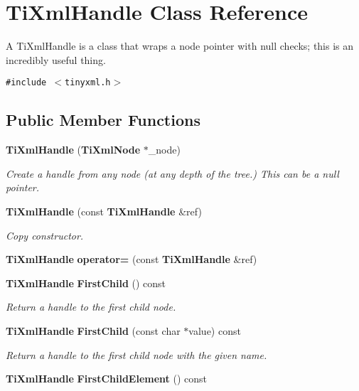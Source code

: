 \section{Ti\-Xml\-Handle Class Reference}
\label{classTiXmlHandle}
A Ti\-Xml\-Handle is a class that wraps a node pointer with null checks; this is an incredibly useful thing.  


{\tt \#include $<$tinyxml.h$>$}

\subsection*{Public Member Functions}
\begin{CompactItemize}
\item 
{\bf Ti\-Xml\-Handle} ({\bf Ti\-Xml\-Node} $\ast$\_\-node)\label{classTiXmlHandle_TiXmlHandlea0}

\begin{CompactList}\small\item\em Create a handle from any node (at any depth of the tree.) This can be a null pointer. \item\end{CompactList}\item 
{\bf Ti\-Xml\-Handle} (const {\bf Ti\-Xml\-Handle} \&ref)\label{classTiXmlHandle_TiXmlHandlea1}

\begin{CompactList}\small\item\em Copy constructor. \item\end{CompactList}\item 
{\bf Ti\-Xml\-Handle} {\bf operator=} (const {\bf Ti\-Xml\-Handle} \&ref)\label{classTiXmlHandle_TiXmlHandlea2}

\item 
{\bf Ti\-Xml\-Handle} {\bf First\-Child} () const\label{classTiXmlHandle_TiXmlHandlea3}

\begin{CompactList}\small\item\em Return a handle to the first child node. \item\end{CompactList}\item 
{\bf Ti\-Xml\-Handle} {\bf First\-Child} (const char $\ast$value) const\label{classTiXmlHandle_TiXmlHandlea4}

\begin{CompactList}\small\item\em Return a handle to the first child node with the given name. \item\end{CompactList}\item 
{\bf Ti\-Xml\-Handle} {\bf First\-Child\-Element} () const\label{classTiXmlHandle_TiXmlHandlea5}


\end{CompactItemize}

